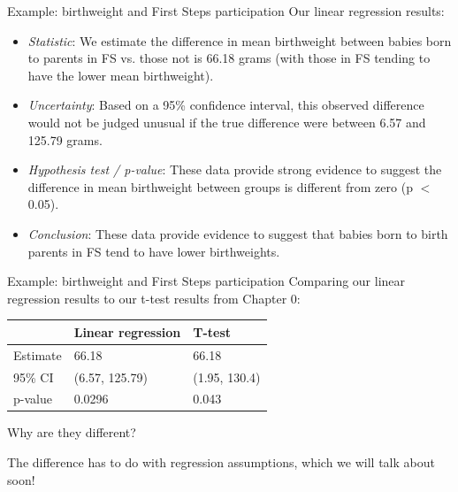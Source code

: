 \documentclass[10pt,t]{beamer}
\begin{document}
\begin{frame}{Example: birthweight and First Steps participation}
Our linear regression results:

\vspace{0.3cm}

\begin{itemize}
	\item \textit{Statistic}: We estimate the difference in mean birthweight between babies born to parents in FS vs. those not is 66.18 grams (with those in FS tending to have the lower mean birthweight). \pause
	\item \textit{Uncertainty}: Based on a 95\% confidence interval, this observed difference would not be judged unusual if the true difference were between 6.57 and 125.79 grams. \pause
	\item \textit{Hypothesis test / p-value}: These data provide strong evidence to suggest the difference in mean birthweight between groups is different from zero (p $<$ 0.05). \pause
	\item \textit{Conclusion}: These data provide evidence to suggest that babies born to birth parents in FS tend to have lower birthweights.
\end{itemize}
\end{frame}

\begin{frame}{Example: birthweight and First Steps participation}
Comparing our linear regression results to our t-test results from Chapter 0:

\vspace{0.3cm}

\begin{table}[]
	\begin{tabular}{l|ll}
		& Linear regression & T-test         \\ \hline
		Estimate & 66.18             & 66.18          \\ \hline
		95\% CI  & (6.57, 125.79)    & (1.95, 130.4) \\ \hline
		p-value  & 0.0296            & 0.043        
	\end{tabular}
\end{table} 
\medskip
Why are they different?\pause

\vspace{0.3cm}

The difference has to do with regression assumptions, which we will talk about soon!

\end{frame}
\end{document}
